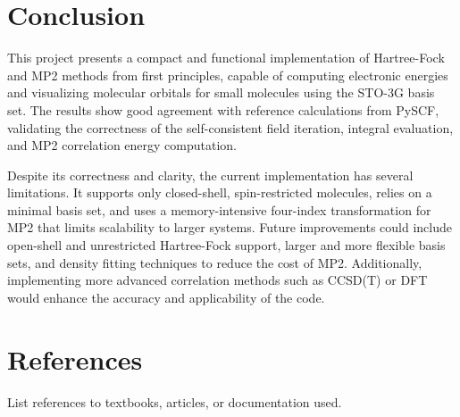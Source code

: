 \documentclass[12pt]{article}
\begin{document}
\section{Conclusion}

This project presents a compact and functional implementation of Hartree-Fock and MP2 methods from first principles, capable of computing electronic energies and visualizing molecular orbitals for small molecules using the STO-3G basis set. The results show good agreement with reference calculations from PySCF, validating the correctness of the self-consistent field iteration, integral evaluation, and MP2 correlation energy computation.

Despite its correctness and clarity, the current implementation has several limitations. It supports only closed-shell, spin-restricted molecules, relies on a minimal basis set, and uses a memory-intensive four-index transformation for MP2 that limits scalability to larger systems. Future improvements could include open-shell and unrestricted Hartree-Fock support, larger and more flexible basis sets, and density fitting techniques to reduce the cost of MP2. Additionally, implementing more advanced correlation methods such as CCSD(T) or DFT would enhance the accuracy and applicability of the code.

\section*{References}
List references to textbooks, articles, or documentation used.
\end{document}
